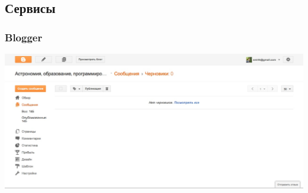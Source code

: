 \documentclass[compress,red]{beamer}
\begin{document}
\subsection{Сервисы}
\begin{frame}
  \frametitle{Blogger}
	\centerline{\includegraphics[width=1.0\textwidth]{images/blogger4.jpg}}
\end{frame}
\end{document}
